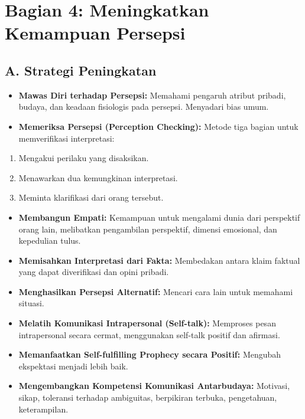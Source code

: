\documentclass[
  letterpaper,
  DIV=11,
  numbers=noendperiod]{scrreprt}
\providecommand{\tightlist}{%
  \setlength{\itemsep}{0pt}\setlength{\parskip}{0pt}}
\begin{document}
\section{Bagian 4: Meningkatkan Kemampuan
Persepsi}\label{bagian-4-meningkatkan-kemampuan-persepsi}

\subsection{A. Strategi Peningkatan}\label{a.-strategi-peningkatan}

\begin{itemize}
\tightlist
\item
  \textbf{Mawas Diri terhadap Persepsi:} Memahami pengaruh atribut
  pribadi, budaya, dan keadaan fisiologis pada persepsi. Menyadari bias
  umum.
\item
  \textbf{Memeriksa Persepsi (Perception Checking):} Metode tiga bagian
  untuk memverifikasi interpretasi:
\end{itemize}

\begin{enumerate}
\def\labelenumi{\arabic{enumi}.}
\tightlist
\item
  Mengakui perilaku yang disaksikan.
\item
  Menawarkan dua kemungkinan interpretasi.
\item
  Meminta klarifikasi dari orang tersebut.
\end{enumerate}

\begin{itemize}
\tightlist
\item
  \textbf{Membangun Empati:} Kemampuan untuk mengalami dunia dari
  perspektif orang lain, melibatkan pengambilan perspektif, dimensi
  emosional, dan kepedulian tulus.
\item
  \textbf{Memisahkan Interpretasi dari Fakta:} Membedakan antara klaim
  faktual yang dapat diverifikasi dan opini pribadi.
\item
  \textbf{Menghasilkan Persepsi Alternatif:} Mencari cara lain untuk
  memahami situasi.
\item
  \textbf{Melatih Komunikasi Intrapersonal (Self-talk):} Memproses pesan
  intrapersonal secara cermat, menggunakan self-talk positif dan
  afirmasi.
\item
  \textbf{Memanfaatkan Self-fulfilling Prophecy secara Positif:}
  Mengubah ekspektasi menjadi lebih baik.
\item
  \textbf{Mengembangkan Kompetensi Komunikasi Antarbudaya:} Motivasi,
  sikap, toleransi terhadap ambiguitas, berpikiran terbuka, pengetahuan,
  keterampilan.
\end{itemize}
\end{document}
